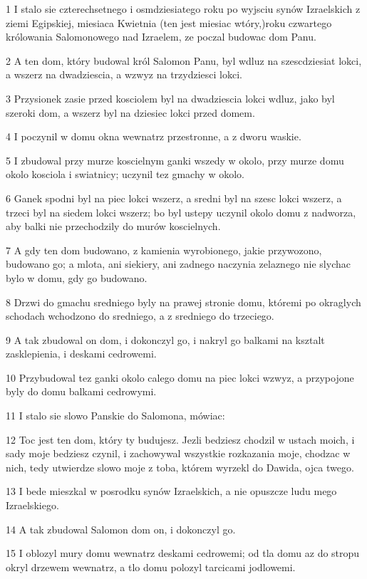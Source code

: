 \par 1 I stalo sie czterechsetnego i osmdziesiatego roku po wyjsciu synów Izraelskich z ziemi Egipskiej, miesiaca Kwietnia (ten jest miesiac wtóry,)roku czwartego królowania Salomonowego nad Izraelem, ze poczal budowac dom Panu.
\par 2 A ten dom, który budowal król Salomon Panu, byl wdluz na szescdziesiat lokci, a wszerz na dwadziescia, a wzwyz na trzydziesci lokci.
\par 3 Przysionek zasie przed kosciolem byl na dwadziescia lokci wdluz, jako byl szeroki dom, a wszerz byl na dziesiec lokci przed domem.
\par 4 I poczynil w domu okna wewnatrz przestronne, a z dworu waskie.
\par 5 I zbudowal przy murze koscielnym ganki wszedy w okolo, przy murze domu okolo kosciola i swiatnicy; uczynil tez gmachy w okolo.
\par 6 Ganek spodni byl na piec lokci wszerz, a sredni byl na szesc lokci wszerz, a trzeci byl na siedem lokci wszerz; bo byl ustepy uczynil okolo domu z nadworza, aby balki nie przechodzily do murów koscielnych.
\par 7 A gdy ten dom budowano, z kamienia wyrobionego, jakie przywozono, budowano go; a mlota, ani siekiery, ani zadnego naczynia zelaznego nie slychac bylo w domu, gdy go budowano.
\par 8 Drzwi do gmachu sredniego byly na prawej stronie domu, któremi po okraglych schodach wchodzono do sredniego, a z sredniego do trzeciego.
\par 9 A tak zbudowal on dom, i dokonczyl go, i nakryl go balkami na ksztalt zasklepienia, i deskami cedrowemi.
\par 10 Przybudowal tez ganki okolo calego domu na piec lokci wzwyz, a przypojone byly do domu balkami cedrowymi.
\par 11 I stalo sie slowo Panskie do Salomona, mówiac:
\par 12 Toc jest ten dom, który ty budujesz. Jezli bedziesz chodzil w ustach moich, i sady moje bedziesz czynil, i zachowywal wszystkie rozkazania moje, chodzac w nich, tedy utwierdze slowo moje z toba, którem wyrzekl do Dawida, ojca twego.
\par 13 I bede mieszkal w posrodku synów Izraelskich, a nie opuszcze ludu mego Izraelskiego.
\par 14 A tak zbudowal Salomon dom on, i dokonczyl go.
\par 15 I oblozyl mury domu wewnatrz deskami cedrowemi; od tla domu az do stropu okryl drzewem wewnatrz, a tlo domu polozyl tarcicami jodlowemi.
